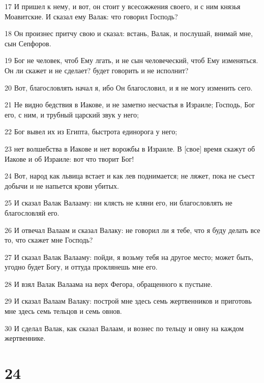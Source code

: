 \par 17 И пришел к нему, и вот, он стоит у всесожжения своего, и с ним князья Моавитские. И сказал ему Валак: что говорил Господь?
\par 18 Он произнес притчу свою и сказал: встань, Валак, и послушай, внимай мне, сын Сепфоров.
\par 19 Бог не человек, чтоб Ему лгать, и не сын человеческий, чтоб Ему изменяться. Он ли скажет и не сделает? будет говорить и не исполнит?
\par 20 Вот, благословлять начал я, ибо Он благословил, и я не могу изменить сего.
\par 21 Не видно бедствия в Иакове, и не заметно несчастья в Израиле; Господь, Бог его, с ним, и трубный царский звук у него;
\par 22 Бог вывел их из Египта, быстрота единорога у него;
\par 23 нет волшебства в Иакове и нет ворожбы в Израиле. В [свое] время скажут об Иакове и об Израиле: вот что творит Бог!
\par 24 Вот, народ как львица встает и как лев поднимается; не ляжет, пока не съест добычи и не напьется крови убитых.
\par 25 И сказал Валак Валааму: ни клясть не кляни его, ни благословлять не благословляй его.
\par 26 И отвечал Валаам и сказал Валаку: не говорил ли я тебе, что я буду делать все то, что скажет мне Господь?
\par 27 И сказал Валак Валааму: пойди, я возьму тебя на другое место; может быть, угодно будет Богу, и оттуда проклянешь мне его.
\par 28 И взял Валак Валаама на верх Фегора, обращенного к пустыне.
\par 29 И сказал Валаам Валаку: построй мне здесь семь жертвенников и приготовь мне здесь семь тельцов и семь овнов.
\par 30 И сделал Валак, как сказал Валаам, и вознес по тельцу и овну на каждом жертвеннике.

\chapter{24}

